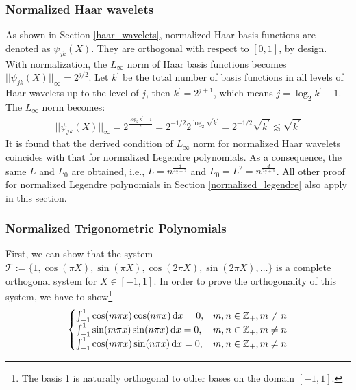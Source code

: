         \subsubsection{Normalized Haar wavelets}\label{normalized_haar_wavelets}
        As shown in Section \ref{haar_wavelets}, normalized Haar basis functions are denoted as $\psi_{jk}(X)$. They are orthogonal with respect to $[0,1]$, by design. With normalization, the $L_{\infty}$ norm of Haar basis functions becomes $||\psi_{jk}(X)||_{\infty}=2^{j/2}$. Let $k^{\prime}$ be the total number of basis functions in all levels of Haar wavelets up to the level of $j$, then $k^{\prime}=2^{j+1}$, which means $j=\log_2k^{\prime}-1$. The $L_{\infty}$ norm becomes:
        \begin{align*}
            ||\psi_{jk}(X)||_{\infty}=2^{\frac{\log_2k^{\prime}-1}{2}}=2^{-1/2}2^{\log_2\sqrt{k^{\prime}}}=2^{-1/2}\sqrt{k^{\prime}} \lesssim \sqrt{k^{\prime}}
        \end{align*}
        It is found that the derived condition of $L_{\infty}$ norm for normalized Haar wavelets coincides with that for normalized Legendre polynomials. As a consequence, the same $L$ and $L_0$ are obtained, i.e., $L=n^{\frac{d}{4\underline{s}+2}}$ and $L_0=L^2=n^{\frac{d}{2\underline{s}+1}}$. All other proof for normalized Legendre polynomials in Section \ref{normalized_legendre} also apply in this section.

        \subsubsection{Normalized Trigonometric Polynomials}\label{normalized_trig_poly}
        First, we can show that the system $\mathcal{T}:=\{1, \cos(\pi X), \sin(\pi X), \cos(2\pi X), \sin(2\pi X),\ldots\}$ is a complete orthogonal system for $X \in [-1,1]$. In order to prove the orthogonality of this system, we have to show\footnote{The basis 1 is naturally orthogonal to other bases on the domain $[-1,1]$.}
        \begin{align*}
        \begin{cases}
            \int_{-1}^1 \cos(m\pi x)\cos(n\pi x)\mathop{}\!\mathrm{d} x=0, & m,n \in \mathbb{Z}_{+}, m \not=n\\
            \int_{-1}^1 \sin(m\pi x)\sin(n\pi x)\mathop{}\!\mathrm{d} x=0, & m,n \in \mathbb{Z}_{+}, m \not=n\\
            \int_{-1}^1 \cos(m\pi x)\sin(n\pi x)\mathop{}\!\mathrm{d} x=0, & m,n \in \mathbb{Z}_{+}, m \not=n
        \end{cases}
        \end{align*}

